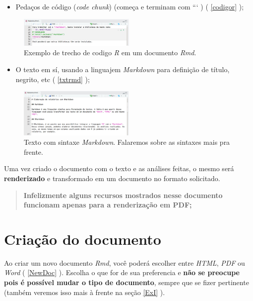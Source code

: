 \documentclass[]{book}
\providecommand{\tightlist}{%
  \setlength{\itemsep}{0pt}\setlength{\parskip}{0pt}}
\begin{document}
\begin{itemize}
\tightlist
\item
  Pedaços de código (\emph{code chunk}) (começa e terminam com \texttt{} ``` ) ( \autoref{codigor} );
\end{itemize}

\begin{figure}
\centering
\includegraphics[width=0.5\textwidth,height=\textheight]{./img/CodigoR.png}
\caption{Exemplo de trecho de codigo \emph{R} em um documento \emph{Rmd}. \label{codigor}}
\end{figure}

\begin{itemize}
\tightlist
\item
  O texto em sí, usando a linguajem \emph{Markdown} para definição de título, negrito, etc ( \autoref{txtrmd} );
\end{itemize}

\begin{figure}
\centering
\includegraphics[width=0.5\textwidth,height=\textheight]{./img/TxtRmd.png}
\caption{Texto com sintaxe \emph{Markdown}. Falaremos sobre as sintaxes mais pra frente. \label{txtrmd}}
\end{figure}

Uma vez criado o documento com o texto e as análises feitas, o mesmo será \textbf{renderizado} e transformado em um documento no formato solicitado.

\begin{quote}
\textbf{Infelizmente alguns recursos mostrados nesse documento funcionam apenas para a renderização em PDF;}
\end{quote}

\hypertarget{CriacaoDoc}{%
\chapter{Criação do documento}\label{CriacaoDoc}}

Ao criar um novo documento \emph{Rmd}, você poderá escolher entre \emph{HTML}, \emph{PDF} ou \emph{Word} ( \autoref{NewDoc} ). Escolha o que for de sua preferencia e \textbf{não se preocupe pois é possível mudar o tipo de documento}, sempre que se fizer pertinente (também veremos isso mais à frente na seção \ref{ExI} ).
\end{document}
